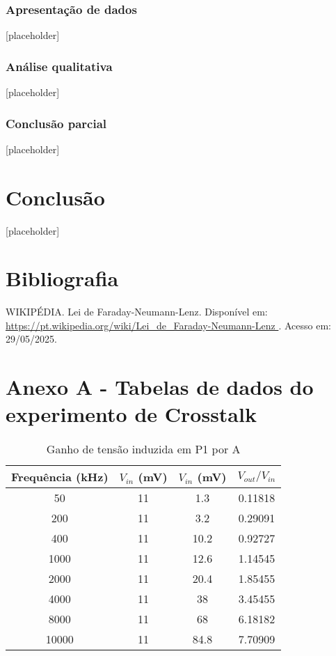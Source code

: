 \documentclass[12pt]{article}
\begin{document}
\subsubsection{Apresentação de dados}
[placeholder]

\subsubsection{Análise qualitativa}
[placeholder]

\subsubsection{Conclusão parcial}
[placeholder]

\section{Conclusão}
[placeholder]

\section{Bibliografia}
WIKIPÉDIA. Lei de Faraday-Neumann-Lenz. Disponível em:
\url{https://pt.wikipedia.org/wiki/Lei_de_Faraday-Neumann-Lenz } .
Acesso em: 29/05/2025.


\clearpage %
\appendix  %

\section*{Anexo A - Tabelas de dados do experimento de Crosstalk}



\begin{table}[h]
  \centering
  \begin{tabular}{c|c|c|c}
    \toprule
    \textbf{Frequência (kHz)} & \textbf{$V_{in}$ (mV)} &
    \textbf{$V_{in}$ (mV)} & \textbf{${V_{out}}/{V_{in}}$} \\
    \midrule
    50	&11	&1.3	&0.11818 \\
    200	&11	&3.2	&0.29091 \\
    400	&11	&10.2	&0.92727 \\
    1000	&11	&12.6	&1.14545 \\
    2000	&11	&20.4	&1.85455 \\
    4000	&11	&38	&3.45455 \\
    8000	&11	&68	&6.18182 \\
    10000	&11	&84.8	&7.70909 \\
    \bottomrule
  \end{tabular}
  \caption{Ganho de tensão induzida em P1 por A}
  \label{tab:ganho-tensao-p1}
\end{table}
\end{document}
